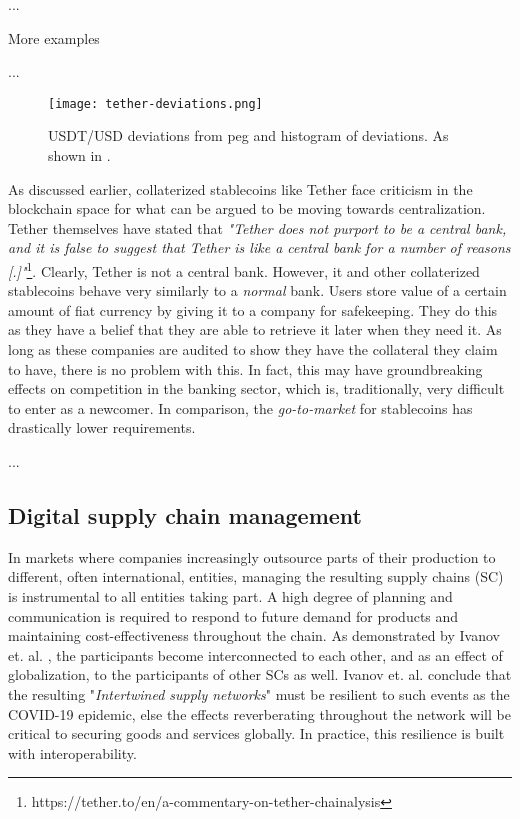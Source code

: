 ...

More examples

...

\begin{figure}
  \texttt{[image: tether-deviations.png]}
  \caption{USDT/USD deviations from peg and histogram of deviations.
  As shown in \cite{lyonsStable}.}
  \label{fig:tether-deviations}
\end{figure}

As discussed earlier, collaterized stablecoins like Tether face
criticism in the blockchain space for what can be argued to be moving
towards centralization. Tether themselves have stated that
\textit{"Tether does not purport to be a central bank, and it is false
to suggest that Tether is like a central bank for a number of reasons
[.]"}\footnote{https://tether.to/en/a-commentary-on-tether-chainalysis}.
Clearly, Tether is not a central bank. However, it and other
collaterized stablecoins behave very similarly to a \textit{normal}
bank. Users store value of a certain amount of fiat currency by giving
it to a company for safekeeping. They do this as they have a belief
that they are able to retrieve it later when they need it. As long as
these companies are audited to show they have the collateral they
claim to have, there is no problem with this. In fact, this may have
groundbreaking effects on competition in the banking sector, which is,
traditionally, very difficult to enter as a newcomer. In comparison,
the \textit{go-to-market} for stablecoins has drastically lower
requirements.


...

\subsection{Digital supply chain management}

In markets where companies increasingly outsource parts of their
production to different, often international, entities, managing the
resulting supply chains (SC) is instrumental to all entities taking
part. A high degree of planning and communication is required to
respond to future demand for products and maintaining
cost-effectiveness throughout the chain. As demonstrated by Ivanov et.
al. \cite{ivanovIntertwined}, the participants become interconnected
to each other, and as an effect of globalization, to the participants
of other SCs as well. Ivanov et. al. conclude that the resulting
"\textit{Intertwined supply networks}" must be resilient to such
events as the COVID-19 epidemic, else the effects reverberating
throughout the network will be critical to securing goods and
services globally. In practice, this resilience is built with interoperability.

